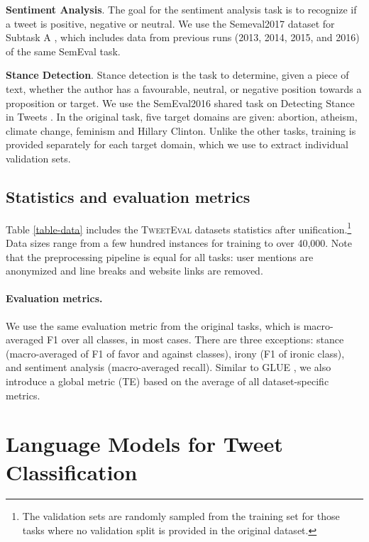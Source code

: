 \documentclass[11pt,a4paper]{article}
\begin{document}
\textbf{Sentiment Analysis}. The goal for the sentiment analysis task is to recognize if a tweet is positive, negative or neutral. 
We use the Semeval2017 dataset for Subtask A \cite{rosenthal2019semeval}, which includes data from previous runs (2013, 2014, 2015, and 2016) of the same SemEval task. 

\textbf{Stance Detection}. Stance detection is the task to determine, given a piece of text, whether the author has a favourable, neutral, or negative position towards a proposition or target. We use the SemEval2016 shared task on Detecting Stance in Tweets \cite{mohammad2016semeval}. In the original task, five target domains are given: abortion, atheism, climate change, feminism and Hillary Clinton. Unlike the other tasks, training is provided separately for each target domain, which we use to extract individual validation sets.


\subsection{Statistics and evaluation metrics}

Table \ref{table-data} includes the \textsc{TweetEval} datasets statistics after unification.\footnote{The validation sets are randomly sampled from the training set for those tasks where no validation split is provided in the original dataset.} Data sizes range from a few hundred instances for training to over 40,000. Note that the preprocessing pipeline is equal for all tasks: user mentions are anonymized and line breaks and website links are removed. 

\paragraph{Evaluation metrics.}
We use the same evaluation metric from the original tasks, which is macro-averaged F1 over all classes, in most cases. There are three exceptions: stance (macro-averaged of F1 of favor and against classes), irony (F1 of ironic class), and sentiment analysis (macro-averaged recall). Similar to GLUE \cite{wang2019glue}, we also introduce a global metric (TE) based on the average of all dataset-specific metrics. 








\section{Language Models for Tweet Classification}
\label{method}
\end{document}

